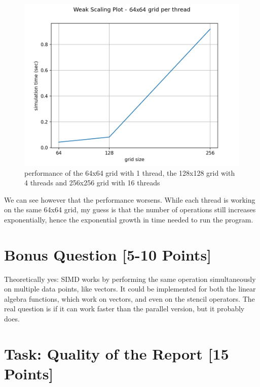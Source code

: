 \documentclass[unicode,11pt,a4paper,oneside,numbers=endperiod,openany]{scrartcl}
\begin{document}
\newline
\begin{figure}[H]
\centering
\includegraphics[width=0.8\linewidth]{weakScalingPlot.png}
\caption{performance of the 64x64 grid with 1 thread, the 128x128 grid with 4 threads and 256x256 grid with 16 threads}
\end{figure}
We can see however that the performance worsens. While each thread is working on the same 64x64 grid, my guess is that the number of operations still increases exponentially, hence the exponential growth in time needed to run the program.

\section{Bonus Question  [5-10 Points]}

Theoretically yes: SIMD works by performing the same operation simultaneously on multiple data points, like vectors. It could be implemented for both the linear algebra functions, which work on vectors, and even on the stencil operators. The real question is if it can work faster than the parallel version, but it probably does.

\section{Task:  Quality of the Report  [15 Points]}
\end{document}
